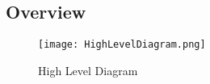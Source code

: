 \subsection{Overview}

\begin{figure}[H]
\caption{High Level Diagram}
\label{fig:HighLevel}
\centering
\texttt{[image: HighLevelDiagram.png]}
\end{figure}
